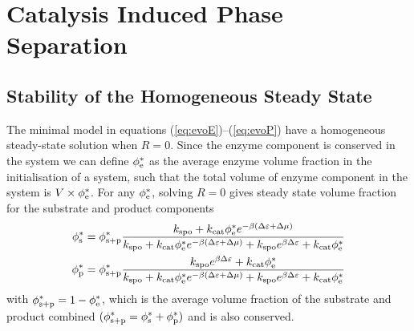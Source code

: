 \section{Catalysis Induced Phase Separation}
\subsection{Stability of the Homogeneous Steady State}
The minimal model in equations (\ref{eq:evoE})--(\ref{eq:evoP}) have a homogeneous steady-state solution when $R=0$. Since the enzyme component is conserved in the system we can define $\phi_{\mathrm{e}}^*$ as the average enzyme volume fraction in the initialisation of a system, such that the total volume of enzyme component in the system is $V \times \phi_{\mathrm{e}}^*$. For any $\phi_{\mathrm{e}}^*$, solving $R=0$ gives steady state volume fraction for the substrate and product components
\begin{align}
    \phi_{\mathrm{s}}^* &= \phi_{\mathrm{s+p}}^*\frac{k_{\mathrm{spo}} + k_{\mathrm{cat}}\phi_{\mathrm{e}}^*e^{-\beta(\Delta \varepsilon + \Delta\mu)}}{k_{\mathrm{spo}} + k_{\mathrm{cat}}\phi_{\mathrm{e}}^*e^{-\beta (\Delta \varepsilon + \Delta\mu)}+k_{\mathrm{spo}} e^{\beta \Delta \varepsilon} + k_{\mathrm{cat}}\phi_{\mathrm{e}}^*}
    \label{sstar}
    \\
    \phi_{\mathrm{p}}^* &= \phi_{\mathrm{s+p}}^*\frac{k_{\mathrm{spo}} e^{\beta \Delta \varepsilon} + k_{\mathrm{cat}}\phi_{\mathrm{e}}^*}{k_{\mathrm{spo}} + k_{\mathrm{cat}}\phi_{\mathrm{e}}^*e^{-\beta (\Delta \varepsilon + \Delta\mu)}+k_{\mathrm{spo}} e^{\beta \Delta \varepsilon} + k_{\mathrm{cat}}\phi_{\mathrm{e}}^*}
    \label{pstar}
\end{align}
with $\phi_{\mathrm{s+p}}^*=1-\phi_{\mathrm{e}}^*$, which is the average volume fraction of the substrate and product combined $(\phi_{\mathrm{s+p}}^*=\phi_{\mathrm{s}}^*+\phi_{\mathrm{p}}^*)$ and is also conserved.


